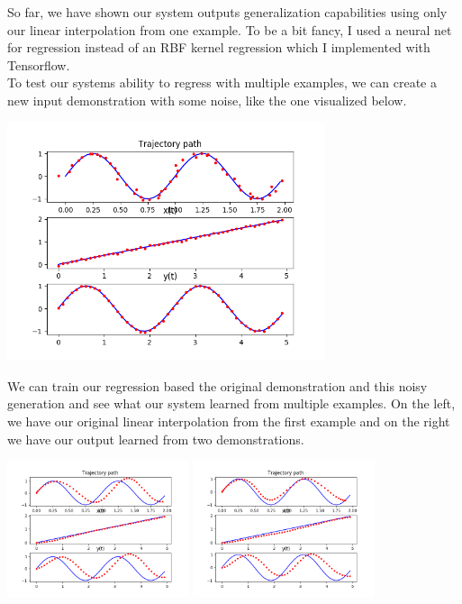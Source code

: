 \documentclass[12pt]{article}
\begin{document}
So far, we have shown our system outputs generalization capabilities using only our linear interpolation from one example. To be a bit fancy, I used a neural net for regression instead of an RBF kernel regression which I implemented with Tensorflow. \\

To test our systems ability to regress with multiple examples, we can create a new input demonstration with some noise, like the one visualized below.

\begin{center}
	\includegraphics[width=0.7\textwidth]{noisy_demonstration}
\end{center}

We can train our regression based the original demonstration and this noisy generation and see what our system learned from multiple examples. On the left, we have our original linear interpolation from the first example and on the right we have our output learned from two demonstrations.

\begin{center}
	\includegraphics[width=0.4\textwidth]{linear_demonstration}
	\includegraphics[width=0.4\textwidth]{regression_demonstration}
\end{center}
\end{document}
